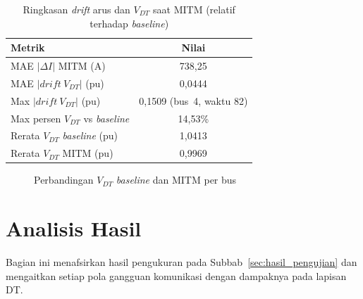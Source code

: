 \renewcommand{\arraystretch}{1.3}
\begin{table}[htbp]
    \centering
    \caption{Ringkasan \textit{drift} arus dan $V_{DT}$ saat \ac{MITM} (relatif terhadap \textit{baseline})}
    \label{tab:hasil_drift_vdt}
    \begin{tabular}{|l|c|}
        \hline
        \textbf{Metrik} & \textbf{Nilai} \\ \hline
        MAE $|\Delta I|$ \ac{MITM} (A) & 738{,}25 \\ \hline
        MAE $|drift\ V_{DT}|$ (pu) & 0{,}0444 \\ \hline
        Max $|drift\ V_{DT}|$ (pu) & 0{,}1509 (bus~4, waktu 82) \\ \hline
        Max persen $V_{DT}$ vs \textit{baseline} & 14{,}53\% \\ \hline
        Rerata $V_{DT}$ \textit{baseline} (pu) & 1{,}0413 \\ \hline
        Rerata $V_{DT}$ \ac{MITM} (pu) & 0{,}9969 \\ \hline
    \end{tabular}
\end{table}

\begin{figure}[htbp]
    \centering
    \caption{Perbandingan $V_{DT}$ \textit{baseline} dan \ac{MITM} per bus}
    \label{fig:hasil_vdt}
\end{figure}

\section{Analisis Hasil}
\label{sec:analisis_hasil}
Bagian ini menafsirkan hasil pengukuran pada Subbab~\ref{sec:hasil_pengujian} dan mengaitkan setiap pola gangguan komunikasi dengan dampaknya pada lapisan \ac{DT}.

